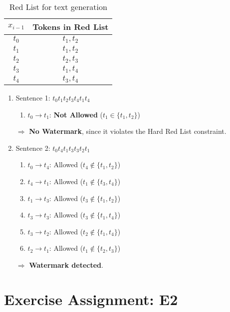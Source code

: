 \documentclass{article}
\begin{document}
\begin{table}[h!]
    \centering
    \caption{Red List for text generation}
    \label{tab-1}
    \begin{tabular}{|c|c|}
        \hline
        $x_{i-1}$ & Tokens in Red List \\ \hline
        $t_0$     & $t_1, t_2$         \\ \hline
        $t_1$     & $t_1, t_2$         \\ \hline
        $t_2$     & $t_2, t_3$         \\ \hline
        $t_3$     & $t_1, t_4$         \\ \hline
        $t_4$     & $t_3, t_4$         \\ \hline
    \end{tabular}
\end{table}

\begin{enumerate}
    \item Sentence 1: \( t_0t_1t_2t_3t_4t_1t_4 \)
          \begin{enumerate}
              \item \( t_0 \to t_1 \): \textbf{Not Allowed} (\( t_1 \in \{t_1, t_2\}\))
          \end{enumerate}
          $\Rightarrow$ \textbf{No Watermark}, since it violates the Hard Red List constraint.

    \item Sentence 2: \( t_0t_4t_1t_3t_3t_2t_1 \)
          \begin{enumerate}
              \item \( t_0 \to t_4 \): Allowed (\(t_4 \notin \{t_1, t_2\}\))
              \item \( t_4 \to t_1 \): Allowed (\(t_1 \notin \{t_3, t_4\}\))
              \item \( t_1 \to t_3 \): Allowed (\(t_3 \notin \{t_1, t_2\}\))
              \item \( t_3 \to t_3 \): Allowed (\(t_3 \notin \{t_1, t_4\}\))
              \item \( t_3 \to t_2 \): Allowed (\(t_2 \notin \{t_1, t_4\}\))
              \item \( t_2 \to t_1 \): Allowed (\(t_1 \notin \{t_2, t_3\}\))
          \end{enumerate}
          $\Rightarrow$ \textbf{Watermark detected}.
\end{enumerate}

\section{Exercise Assignment: E2}\label{sec:e2}
\end{document}
